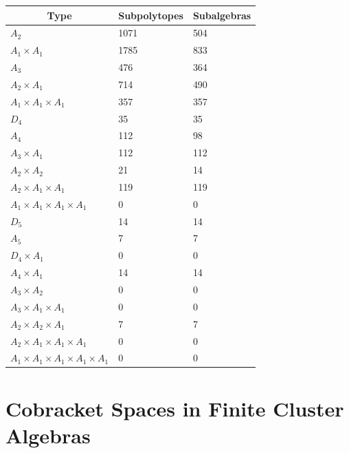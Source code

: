\documentclass[11pt]{article}
\begin{document}
\begin{tabular}{ | l | l | l |}
\multicolumn{1}{c}{Type} &  \multicolumn{1}{c}{Subpolytopes}  &  \multicolumn{1}{c}{Subalgebras} \\
\hline \(A_2\) & 1071 & 504 \\ 
\hline \(A_1 \times A_1\) & 1785 & 833 \\ \hline 
\hline \(A_3\) & 476 & 364 \\ 
\hline \(A_2 \times A_1\) & 714 & 490 \\ 
\hline \(A_1 \times A_1 \times A_1\) & 357 & 357 \\ \hline 
\hline \(D_4\) & 35 & 35 \\ 
\hline \(A_4\) & 112 & 98 \\ 
\hline \(A_3 \times A_1\) & 112 & 112 \\ 
\hline \(A_2 \times A_2\) & 21 & 14 \\ 
\hline \(A_2 \times A_1 \times A_1\) & 119 & 119 \\ 
\hline \(A_1 \times A_1 \times A_1 \times A_1\) & 0 & 0 \\ \hline 
\hline \(D_5\) & 14 & 14 \\ 
\hline \(A_5\) & 7 & 7 \\ 
\hline \(D_4 \times A_1\) & 0 & 0 \\ 
\hline \(A_4 \times A_1\) & 14 & 14 \\ 
\hline \(A_3 \times A_2\) & 0 & 0 \\ 
\hline \(A_3 \times A_1 \times A_1\) & 0 & 0 \\ 
\hline \(A_2 \times A_2 \times A_1\) & 7 & 7 \\ 
\hline \(A_2 \times A_1 \times A_1 \times A_1\) & 0 & 0 \\ 
\hline \(A_1 \times A_1 \times A_1 \times A_1 \times A_1\) & 0 & 0 \\ 
\hline
\end{tabular}
\section{Cobracket Spaces in Finite Cluster Algebras}




\end{document}
